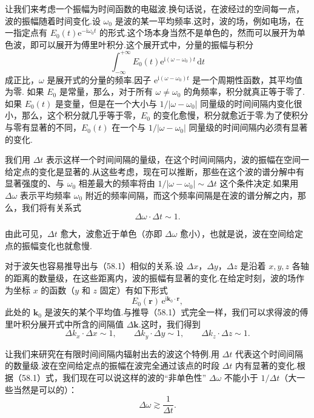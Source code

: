 让我们来考虑一个振幅为时间函数的电磁波.换句话说，在波经过的空间每一点，波的振幅随着时间变化.设 $\omega_0$ 是波的某一平均频率.这时，波的场，例如电场，在一指定点有 $E_0(t)\mathrm{e}^{-\mathrm{i}\omega_0 t}$ 的形式.这个场本身当然不是单色的，然而可以展开为单色波，即可以展开为傅里叶积分.这个展开式中，分量的振幅与积分
\begin{equation*}
  \int_{-\infty}^{+\infty}E_0(t)\mathrm{e}^{\mathrm{i}(\omega-\omega_0)t}\,\mathrm{d}t
\end{equation*}
成正比，$\omega$ 是展开式的分量的频率.因子 $\mathrm{e}^{\mathrm{i}(\omega-\omega_0)t}$ 是一个周期性函数，其平均值为零. 如果 $E_0$ 是常量，那么，对于所有 $\omega\neq\omega_0$ 的角频率，积分就真正等于零了.如果 $E_0(t)$ 是变量，但是在一个大小与 $1/|\omega-\omega_0|$ 同量级的时间间隔内变化很小，那么，这个积分就几乎等于零，$E_0$ 的变化愈慢，积分就愈近于零.为了使积分与零有显著的不同，$E_0(t)$ 在一个与 $1/|\omega-\omega_0|$ 同量级的时间间隔内必须有显著的变化.

我们用 $\Delta t$ 表示这样一个时间间隔的量级，在这个时间间隔内，波的振幅在空间一给定点的变化是显著的.从这些考虑，现在可以推断，那些在这个波的谱分解中有显著强度的、与 $\omega_0$ 相差最大的频率将由 $1/|\omega-\omega_0|\sim\Delta t$ 这个条件决定.如果用 $\Delta\omega$ 表示平均频率 $\omega_0$ 附近的频率间隔，而这个频率间隔是在波的谱分解之内，那么，我们将有关系式
\begin{equation}
  \Delta\omega\cdot\Delta t\sim 1.
\end{equation}

由此可见，$\Delta t$ 愈大，波愈近于单色（亦即 $\Delta\omega$ 愈小），也就是说，波在空间给定点的振幅变化也就愈慢.

对于波矢也容易推导出与（58.1）相似的关系.设 $\Delta x$，$\Delta y$，$\Delta z$ 是沿着 $x,y,z$ 各轴的距离的数量级，在这些距离内，波的振幅有显著的变化.在给定时刻，波的场作为坐标 $x$ 的函数（$y$ 和 $z$ 固定）有如下形式
\begin{equation*}
  E_0(\boldsymbol{r})\,\mathrm{e}^{\mathrm{i}\boldsymbol{k}_0\cdot\boldsymbol{r}},
\end{equation*}
此处的 $\boldsymbol{k}_0$ 是波矢的某个平均值.与推导（58.1）式完全一样，我们可以求得波的傅里叶积分展开式中所含的间隔值 $\Delta\boldsymbol{k}$.这时，我们得到
\begin{equation}
  \Delta k_x\cdot\Delta x\sim 1,\qquad
  \Delta k_y\cdot\Delta y\sim 1,\qquad
  \Delta k_z\cdot\Delta z\sim 1.
\end{equation}

让我们来研究在有限时间间隔内辐射出去的波这个特例.用 $\Delta t$ 代表这个时间间隔的数量级.波在空间给定点的振幅在波完全通过该点的时段 $\Delta t$ 内有显著的变化.根据（58.1）式，我们现在可以说这样的波的“非单色性” $\Delta\omega$ 不能小于 $1/\Delta t$（大一些当然是可以的）：
\begin{equation}
  \Delta\omega\gtrsim\frac{1}{\Delta t}.
\end{equation}

